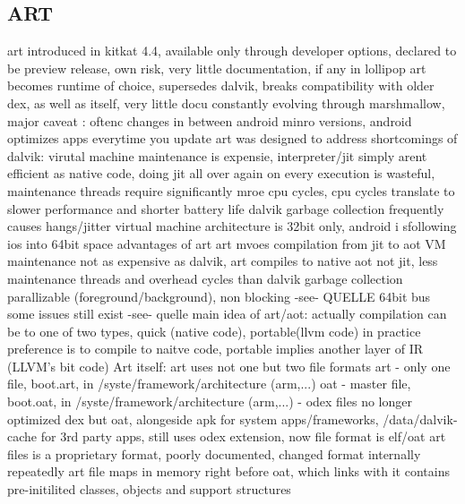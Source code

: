 \subsection{ART} \label{subsection:android-art}

%
art introduced in kitkat 4.4, available only through developer options,  declared to be preview release, own risk, very little documentation, if any
in lollipop art becomes runtime of choice, supersedes dalvik, breaks compatibility with older dex, as well as itself, very little docu
constantly evolving  through marshmallow, major caveat : oftenc changes in between android minro versions, android optimizes apps everytime you update\newline
art was designed to address shortcomings of dalvik:
virutal machine maintenance is expensie, interpreter/jit simply arent efficient as native code, doing jit all over again on every execution is wasteful, maintenance threads require significantly mroe cpu cycles, cpu cycles translate to slower performance and shorter battery life
dalvik garbage collection frequently causes hangs/jitter
virtual machine architecture is 32bit only, android i sfollowing ios into 64bit space\newline
advantages of art
art mvoes compilation from \gls{jit} to \gls{aot}
VM maintenance not as expensive as dalvik, art compiles to native \gls{aot} not \gls{jit}, less maintenance threads and overhead cycles than dalvik
garbage collection parallizable (foreground/background), non blocking -see- QUELLE
64bit bus some issues still exist -see- quelle\newline
main idea of art/aot:
actually compilation can be to one of two types, quick (native code), portable(llvm code)
in practice preference is to compile to naitve code, portable implies another layer of IR (LLVM's bit code)\newline
Art itself:
art uses not one but two file formats
art - only one file, boot.art, in /syste/framework/architecture (arm,...)
oat - master file, boot.oat, in /syste/framework/architecture (arm,...) - odex files no longer optimized dex but oat, alongeside apk for system apps/frameworks, /data/dalvik-cache for 3rd party apps, still uses odex extension, now file format is elf/oat\newline
art files is a proprietary format, poorly documented, changed format internally repeatedly
art file maps in memory right before oat, which links with it
contains pre-initilited classes, objects and support structures\newline
